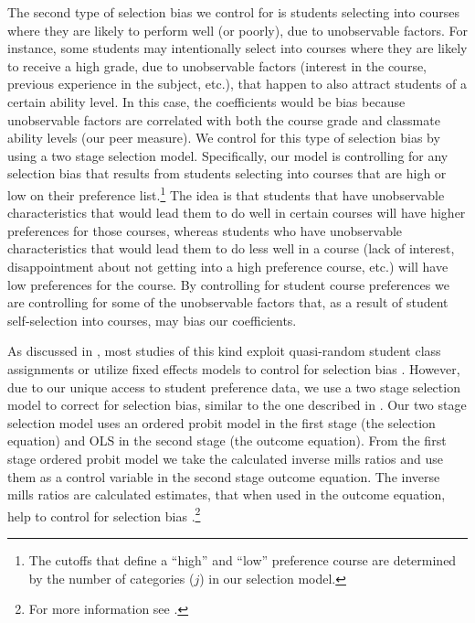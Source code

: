 The second type of selection bias we control for is students selecting into courses where they are likely to perform well (or poorly), due to unobservable factors. 
For instance, some students may intentionally select into courses where they are likely to receive a high grade, due to unobservable factors (interest in the course, previous experience in the subject, etc.), that happen to also attract students of a certain ability level.
In this case, the coefficients would be bias because unobservable factors are correlated with both the course grade and classmate ability levels (our peer measure).
We control for this type of selection bias by using a two stage selection model.
Specifically, our model is controlling for any selection bias that results from students selecting into courses that are high or low on their preference list.\footnote{The cutoffs that define a ``high'' and ``low'' preference course are determined by the number of categories ($j$) in our selection model.} 
The idea is that students that have unobservable characteristics that would lead them to do well in certain courses will have higher preferences for those courses, whereas students who have unobservable characteristics that would lead them to do less well in a course (lack of interest, disappointment about not getting into a high preference course, etc.) will have low preferences for the course.
By controlling for student course preferences we are controlling for some of the unobservable factors that, as a result of student self-selection into courses, may bias our coefficients.

As discussed in , most studies of this kind exploit quasi-random student class assignments or utilize fixed effects models to control for selection bias \citep{kang2007classroom,carman2012classroom,schlosser2008inside,lavy2012good}. 
However, due to our unique access to student preference data, we use a two stage selection model to correct for selection bias, similar to the one described in \citet{heckman1979sample}. 
Our two stage selection model uses an ordered probit model in the first stage (the selection equation) and OLS in the second stage (the outcome equation). 
From the first stage ordered probit model we take the calculated inverse mills ratios and use them as a control variable in the second stage outcome equation. 
The inverse mills ratios are calculated estimates, that when used in the outcome equation, help to control for selection bias \citep{heckman1979sample}.\footnote{For more information see \citet{greene2002limdep}.}

